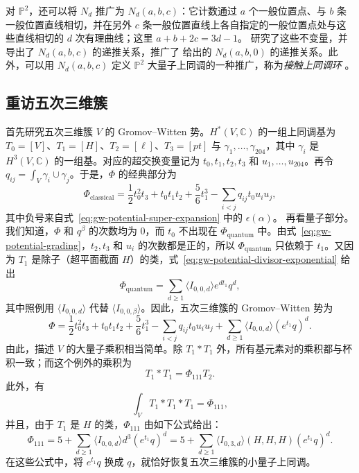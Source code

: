 对 $\mathbb P^2$，还可以将 $N_d$ 推广为 $N_d(a,b,c)$：它计数通过 $a$ 个一般位置点、与 $b$ 条一般位置直线相切，并在另外 $c$ 条一般位置直线上各自指定的一般位置点处与这些直线相切的 $d$ 次有理曲线；这里 $a+b+2c=3d-1$。 研究了这些不变量，并导出了 $N_d(a,b,c)$ 的递推关系，推广了  给出的 $N_d(a,b,0)$ 的递推关系。此外，可以用 $N_d(a,b,c)$ 定义 $\mathbb P^2$ 大量子上同调的一种推广，称为\emph{接触上同调环} 。

\subsection{重访五次三维簇}\label{subsec:quintic-gw-potential}
首先研究五次三维簇 $V$ 的 Gromov--Witten 势。$H^*(V,\mathbb C)$ 的一组上同调基为 $T_0=[V]$、$T_1=[H]$、$T_2=[\ell]$、$T_3=[pt]$ 与 $\gamma_1,\ldots,\gamma_{204}$，其中 $\gamma_i$ 是 $H^3(V,\mathbb C)$ 的一组基。对应的超交换变量记为 $t_0,t_1,t_2,t_3$ 和 $u_1,\ldots,u_{204}$。再令 $q_{ij}=\int_V\gamma_i\cup\gamma_j$。于是，$\Phi$ 的经典部分为
\[
\Phi_{\mathrm{classical}}=\frac12t_0^2t_3+t_0t_1t_2+
\frac56t_1^3-\sum_{i<j}q_{ij}t_0u_iu_j,
\]
其中负号来自式~\eqref{eq:gw-potential-super-expansion} 中的 $\epsilon(\alpha)$。
再看量子部分。我们知道，$\Phi$ 和 $q^\beta$ 的次数均为 $0$，而 $t_0$ 不出现在 $\Phi_{\mathrm{quantum}}$ 中。由式~\eqref{eq:gw-potential-grading}，$t_2,t_3$ 和 $u_i$ 的次数都是正的，所以 $\Phi_{\mathrm{quantum}}$ 只依赖于 $t_1$。又因为 $T_1$ 是除子（超平面截面 $H$）的类，式~\eqref{eq:gw-potential-divisor-exponential} 给出
\begin{equation}\label{eq:quintic-quantum-potential}
\Phi_{\mathrm{quantum}}=\sum_{d\ge1}\langle I_{0,0,d}\rangle e^{dt_1}q^d,
\end{equation}
其中照例用 $\langle I_{0,0,d}\rangle$ 代替 $\langle I_{0,0,\beta}\rangle$。因此，五次三维簇的 Gromov--Witten 势为
\[
\Phi=\frac12t_0^2t_3+t_0t_1t_2+\frac56t_1^3
-\sum_{i<j}q_{ij}t_0u_iu_j+\sum_{d\ge1}\langle I_{0,0,d}\rangle(e^{t_1}q)^d.
\]
由此，描述 $V$ 的大量子乘积相当简单。除 $T_1*T_1$ 外，所有基元素对的乘积都与杯积一致；而这个例外的乘积为
\[
T_1*T_1=\Phi_{111}T_2.
\]
此外，有
\[
\int_V T_1*T_1*T_1=\Phi_{111},
\]
并且，由于 $T_1$ 是 $H$ 的类，$\Phi_{111}$ 由如下公式给出：
\[
\Phi_{111}=5+\sum_{d\ge1}\langle I_{0,0,d}\rangle d^3(e^{t_1}q)^d
=5+\sum_{d\ge1}\langle I_{0,3,d}\rangle(H,H,H)(e^{t_1}q)^d.
\]
在这些公式中，将 $e^{t_1}q$ 换成 $q$，就恰好恢复五次三维簇的小量子上同调。

